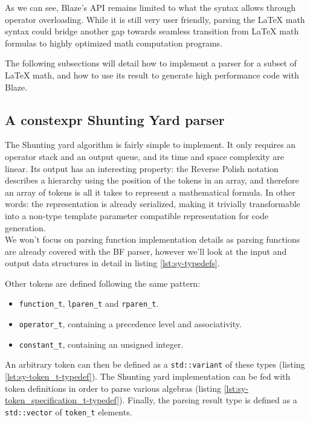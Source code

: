 \documentclass[../paper.tex]{subfiles}
\begin{document}
As we can see, Blaze's API remains limited to what the \cpp syntax allows
through operator overloading. While it is still very user friendly,
parsing the \LaTeX{} math syntax could bridge another gap towards
seamless transition from \LaTeX{} math formulas to
highly optimized math computation programs.

The following subsections will detail how to implement a \constexpr parser
for a subset of \LaTeX{} math, and how to use its result to generate
high performance code with Blaze.

\subsection{A constexpr Shunting Yard parser}

The Shunting yard algorithm is fairly simple to implement. It only requires an
operator stack and an output queue, and its time and space complexity are
linear. Its output has an interesting property: the Reverse Polish notation
describes a hierarchy using the position of the tokens in an array, and
therefore an array of tokens is all it takes to represent a mathematical formula.
In other words: the representation is already serialized, making it trivially
transformable into a non-type template parameter compatible representation for
code generation.\\

We won't focus on parsing function implementation details as
\constexpr parsing functions are already covered with the BF parser, however
we'll look at the input and output data structures in detail in
listing \ref{lst:sy-typedefs}.



Other tokens are defined following the same pattern:

\begin{itemize}
\item \lstinline{function_t}, \lstinline{lparen_t} and \lstinline{rparen_t}.
\item \lstinline{operator_t}, containing a precedence level and associativity.
\item \lstinline{constant_t}, containing an unsigned integer.
\end{itemize}

An arbitrary token can then be defined as a \lstinline{std::variant} of these
types (listing \ref{lst:sy-token_t-typedef}). The Shunting yard implementation
can be fed with token definitions in order to parse various algebras
(listing \ref{lst:sy-token_specification_t-typedef}). Finally, the parsing result
type is defined as a \lstinline{std::vector} of \lstinline{token_t} elements.
\end{document}
